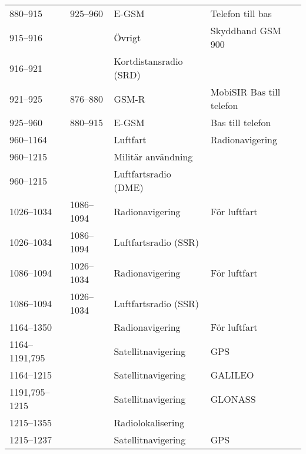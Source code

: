 \begin{landscape}
\begin{landscape}
\begin{longtable}{llll}
	880--915           & 925--960           & E-GSM                   & Telefon till bas                      \\
	915--916           &                    & Övrigt                  & Skyddband GSM 900                     \\
	916--921           &                    & Kortdistansradio (SRD)  &                                       \\
	921--925           & 876--880           & GSM-R                   & MobiSIR Bas till telefon              \\
	925--960           & 880--915           & E-GSM                   & Bas till telefon                      \\
	960--1164          &                    & Luftfart                & Radionavigering                       \\
	960--1215          &                    & Militär användning      &                                       \\
	960--1215          &                    & Luftfartsradio (DME)    &                                       \\
	1026--1034         & 1086--1094         & Radionavigering         & För luftfart                          \\
	1026--1034         & 1086--1094         & Luftfartsradio (SSR)    &                                       \\
	1086--1094         & 1026--1034         & Radionavigering         & För luftfart                          \\
	1086--1094         & 1026--1034         & Luftfartsradio (SSR)    &                                       \\
	1164--1350         &                    & Radionavigering         & För luftfart                          \\
	1164--1191,795     &                    & Satellitnavigering      & GPS                                   \\
	1164--1215         &                    & Satellitnavigering      & GALILEO                               \\
	1191,795--1215     &                    & Satellitnavigering      & GLONASS                               \\
	1215--1355         &                    & Radiolokalisering       &                                       \\
	1215--1237         &                    & Satellitnavigering      & GPS                                   \\

\end{longtable}
\end{landscape}
\end{landscape}
